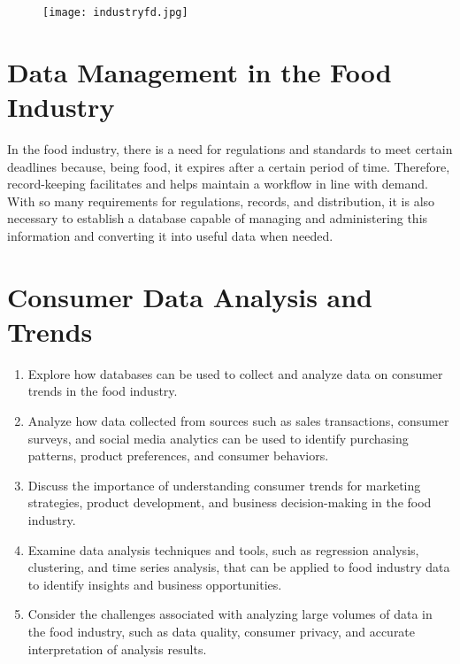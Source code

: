 \documentclass{article}
\begin{document}
\begin{figure}
\centering
\texttt{[image: industryfd.jpg]}
\end{figure}


\section{Data Management in the Food Industry}
In the food industry, there is a need for regulations and standards to meet certain deadlines because, being food, it expires after a certain period of time. Therefore, record-keeping facilitates and helps maintain a workflow in line with demand. 
With so many requirements for regulations, records, and distribution, it is also necessary to establish a database capable of managing and administering this information and converting it into useful data when needed.

\section{Consumer Data Analysis and Trends}
\begin{enumerate}
    \item Explore how databases can be used to collect and analyze data on consumer trends in the food industry.
    \item Analyze how data collected from sources such as sales transactions, consumer surveys, and social media analytics can be used to identify purchasing patterns, product preferences, and consumer behaviors.
    
    \item Discuss the importance of understanding consumer trends for marketing strategies, product development, and business decision-making in the food industry.
    
    \item Examine data analysis techniques and tools, such as regression analysis, clustering, and time series analysis, that can be applied to food industry data to identify insights and business opportunities.
    
    \item Consider the challenges associated with analyzing large volumes of data in the food industry, such as data quality, consumer privacy, and accurate interpretation of analysis results.
    
\end{enumerate}
\end{document}
